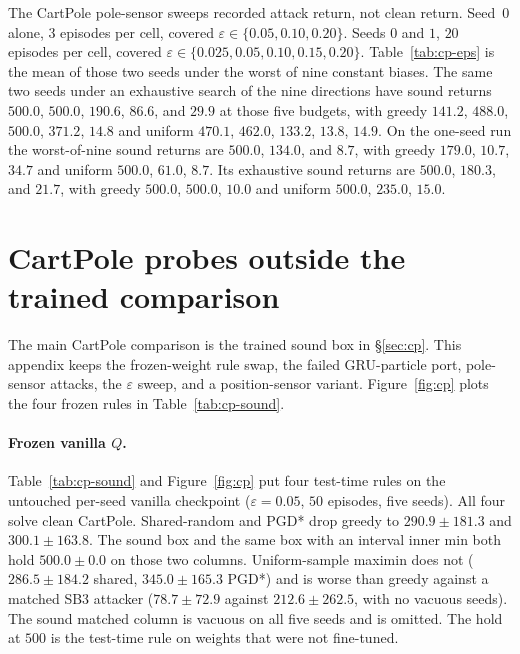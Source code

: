 \documentclass[10pt,twocolumn]{article}
\begin{document}
The CartPole pole-sensor sweeps recorded attack return, not clean return.
Seed~$0$ alone, $3$ episodes per cell, covered $\varepsilon\in\{0.05,0.10,0.20\}$.
Seeds $0$ and $1$, $20$ episodes per cell, covered $\varepsilon\in\{0.025,0.05,0.10,0.15,0.20\}$.
Table~\ref{tab:cp-eps} is the mean of those two seeds under the worst of nine constant biases.
The same two seeds under an exhaustive search of the nine directions have sound returns $500.0$, $500.0$, $190.6$, $86.6$, and $29.9$ at those five budgets, with greedy $141.2$, $488.0$, $500.0$, $371.2$, $14.8$ and uniform $470.1$, $462.0$, $133.2$, $13.8$, $14.9$.
On the one-seed run the worst-of-nine sound returns are $500.0$, $134.0$, and $8.7$, with greedy $179.0$, $10.7$, $34.7$ and uniform $500.0$, $61.0$, $8.7$.
Its exhaustive sound returns are $500.0$, $180.3$, and $21.7$, with greedy $500.0$, $500.0$, $10.0$ and uniform $500.0$, $235.0$, $15.0$.

\section{CartPole probes outside the trained comparison}
\label{app:cp-extra}

The main CartPole comparison is the trained sound box in \S\ref{sec:cp}.
This appendix keeps the frozen-weight rule swap, the failed GRU-particle port, pole-sensor attacks, the $\varepsilon$ sweep, and a position-sensor variant.
Figure~\ref{fig:cp} plots the four frozen rules in Table~\ref{tab:cp-sound}.

\paragraph{Frozen vanilla $Q$.}
Table~\ref{tab:cp-sound} and Figure~\ref{fig:cp} put four test-time rules on the untouched per-seed vanilla checkpoint ($\varepsilon{=}0.05$, $50$ episodes, five seeds).
All four solve clean CartPole.
Shared-random and PGD* drop greedy to $290.9{\pm}181.3$ and $300.1{\pm}163.8$.
The sound box and the same box with an interval inner min both hold $500.0{\pm}0.0$ on those two columns.
Uniform-sample maximin does not ($286.5{\pm}184.2$ shared, $345.0{\pm}165.3$ PGD*) and is worse than greedy against a matched SB3 attacker ($78.7{\pm}72.9$ against $212.6{\pm}262.5$, with no vacuous seeds).
The sound matched column is vacuous on all five seeds and is omitted.
The hold at $500$ is the test-time rule on weights that were not fine-tuned.
\end{document}
